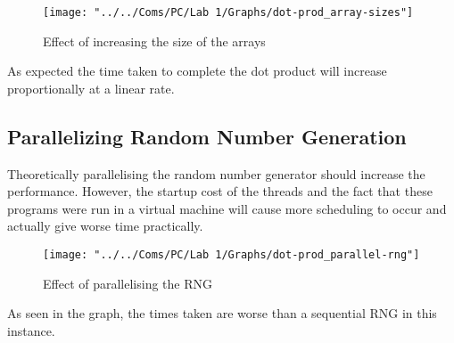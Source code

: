 \documentclass[paper=a4, fontsize=11pt]{scrartcl} %
\numberwithin{equation}{section} %
\numberwithin{figure}{section} %
\numberwithin{table}{section} %
\begin{document}
	\begin{figure}[!h]
		\centering
		\texttt{[image: "../../Coms/PC/Lab 1/Graphs/dot-prod\_array-sizes"]}
		\caption{Effect of increasing the size of the arrays}
	\end{figure}

As expected the time taken to complete the dot product will increase proportionally at a linear rate.


\subsection{Parallelizing Random Number Generation}
 Theoretically parallelising the random number generator should increase the performance. However, the startup cost of the threads and the fact that these programs were run in a virtual machine will cause more scheduling to occur and actually give worse time practically.
 
	\begin{figure}[!h]
		\centering
		\texttt{[image: "../../Coms/PC/Lab 1/Graphs/dot-prod\_parallel-rng"]}
		\caption{Effect of parallelising the RNG}
	\end{figure}

As seen in the graph, the times taken are worse than a sequential RNG in this instance.

\end{document}
